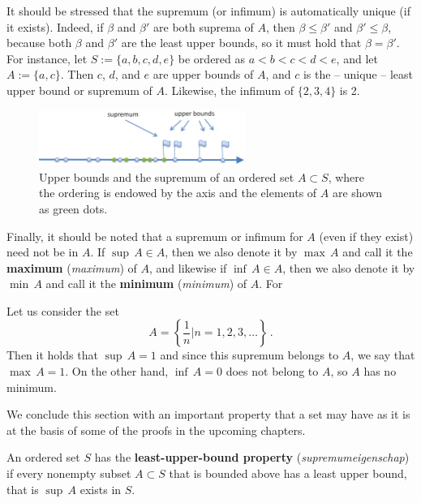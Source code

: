 	
	
	
	It should be stressed that the supremum (or infimum) is automatically unique (if it exists).  Indeed, if $\beta$ and
	$\beta'$ are both suprema of $A$, then $\beta \leq \beta'$ and $\beta' \leq \beta$, because both $\beta$ and $\beta'$ are the least upper bounds, so it must hold that $\beta=\beta'$. For instance, let $S := \{ a, b, c, d, e \}$ be ordered as $a < b < c < d < e$, and let $A := \{ a, c \}$.  Then $c$, $d$, and $e$ are upper bounds of $A$, and $c$ is the -- unique -- least upper bound or supremum of $A$. Likewise, the infimum of  $\{2,3,4\}$ is 2. 
	\begin{figure}[h]
		\begin{center}
			\includegraphics[width=0.6\textwidth]{fig_sets_5}
			\caption{Upper bounds and the supremum of an ordered set $A\subset S$, where the ordering is endowed by the axis and the elements of $A$ are shown as green dots.}
			\label{fig_sets_5}
		\end{center}
	\end{figure}
	
	Finally, it should be noted that a supremum or infimum for $A$ (even if they exist) need not be in $A$. If $\sup \, A \in A$, then we also denote it by $\max\, A$ and call it the \textbf{maximum} (\textit{maximum}) of $A$, and likewise if $\inf\, A\in A$, then we also denote it by $\min\, A$ and call it the \textbf{minimum} (\textit{minimum}) of $A$. For 
	
	\begin{example}
		Let us consider the set
		$$
		A=\left\{\dfrac{1}{n}\bigg| n=1,2,3,\ldots\right\}\,.
		$$ 
		Then it holds that $\sup\, A = 1$ and since this supremum belongs to
		$A$, we say that $\max\, A =1$. On the other hand, $\inf\, A = 0$ does not belong to $A$, so $A$ has no minimum.
	\end{example}
	
	We conclude this section with an important property that a set may have as it is at the basis of some of the proofs in the upcoming chapters. 
	\begin{definition} \label{defn:lub}
		An ordered set $S$ has the \textbf{{least-upper-bound property}} (\textit{supremumeigenschap}) if
		every nonempty subset $A \subset S$ that is bounded above has a least upper bound, that is $\sup\, A$ exists in $S$.
	\end{definition}
	
